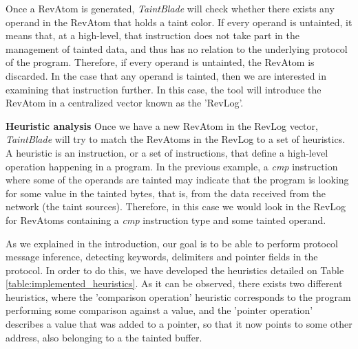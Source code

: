 \documentclass[conference]{IEEEtran}
\begin{document}
Once a RevAtom is generated, \textit{TaintBlade} will check whether there
exists any operand in the RevAtom that holds a taint color. If every operand is
untainted, it means that, at a high-level, that instruction does not take part
in the management of tainted data, and thus has no relation to the underlying
protocol of the program. Therefore, if every operand is untainted, the RevAtom
is discarded. In the case that any operand is tainted, then we are interested
in examining that instruction further. In this case, the tool will introduce
the RevAtom in a centralized vector known as the 'RevLog'.

\textbf{Heuristic analysis}
Once we have a new RevAtom in the RevLog vector, \textit{TaintBlade} will try to match the RevAtoms in the RevLog
to a set of heuristics. A heuristic is an instruction, or a set of instructions, that define a high-level
operation happening in a program. In the previous example, a \textit{cmp} instruction where some of the operands
are tainted may indicate that the program is looking for some value in the tainted bytes, that is, from the data
received from the network (the taint sources). Therefore, in this case we would look in the RevLog for RevAtoms
containing a \textit{cmp} instruction type and some tainted operand.

As we explained in the introduction, our goal is to be able to perform protocol
message inference, detecting keywords, delimiters and pointer fields in the
protocol. In order to do this, we have developed the heuristics detailed on
Table \ref{table:implemented_heuristics}. As it can be observed, there exists
two different heuristics, where the 'comparison operation' heuristic
corresponds to the program performing some comparison against a value, and the
'pointer operation' describes a value that was added to a pointer, so that it
now points to some other address, also belonging to a the tainted buffer.
\end{document}
